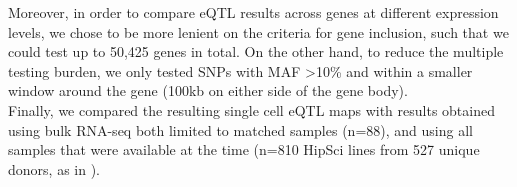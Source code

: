 \newpage

Moreover, in order to compare eQTL results across genes at different expression levels, we chose to be more lenient on the criteria for gene inclusion, such that we could test
up to 50,425 genes in total. 
On the other hand, to reduce the multiple testing burden, we only tested SNPs with MAF >10\% and within a smaller window around the gene (100kb on either side of the gene body).
\\

Finally, we compared the resulting single cell eQTL maps with results obtained using bulk RNA-seq both limited to matched samples (n=88), and using all samples that were available at the time (n=810 HipSci lines from 527 unique donors, as in \cite{bonder2019systematic}). 






